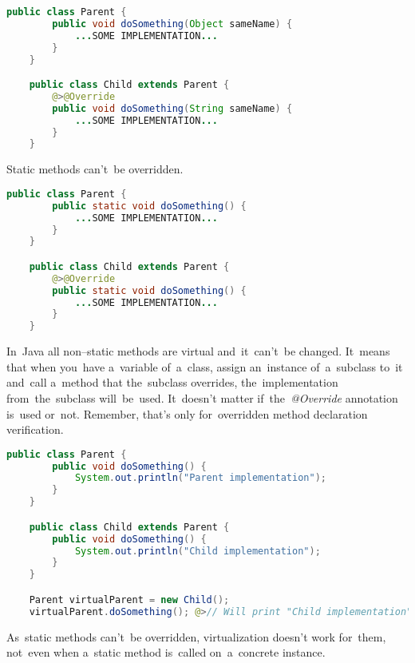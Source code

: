 \begin{lstlisting}[language=Java]
    public class Parent {
        public void doSomething(Object sameName) {
            ...SOME IMPLEMENTATION...
        }
    }

    public class Child extends Parent {
        @>@Override
        public void doSomething(String sameName) {
            ...SOME IMPLEMENTATION...
        }
    }
\end{lstlisting}

\warning Static methods can't~be overridden.

\begin{lstlisting}[language=Java]
    public class Parent {
        public static void doSomething() {
            ...SOME IMPLEMENTATION...
        }
    }

    public class Child extends Parent {
        @>@Override
        public static void doSomething() {
            ...SOME IMPLEMENTATION...
        }
    }
\end{lstlisting}

\label{javavirtualmethods}
In~Java all non--static methods are virtual and~it~can't~be changed.
It~means that when you~have a~variable of~a~class, assign an~instance of~a~subclass to~it and~call a~method that the~subclass overrides, the~implementation from~the~subclass will~be~used.
It~doesn't matter if~the~\textit{@Override} annotation is~used or~not.
Remember, that's only for~overridden method declaration verification.

\begin{lstlisting}[language=Java]
    public class Parent {
        public void doSomething() {
            System.out.println("Parent implementation");
        }
    }

    public class Child extends Parent {
        public void doSomething() {
            System.out.println("Child implementation");
        }
    }

    Parent virtualParent = new Child();
    virtualParent.doSomething(); @>// Will print "Child implementation"
\end{lstlisting}

\warning As~static methods can't~be overridden, virtualization doesn't work for~them, not~even when a~static method is~called on~a~concrete instance.

